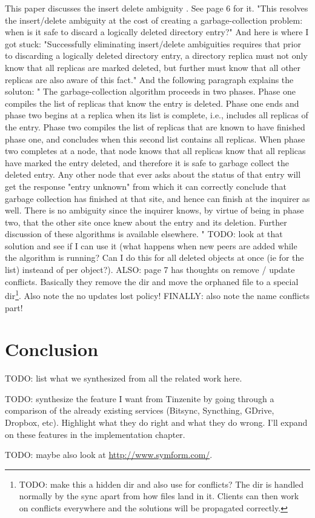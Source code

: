 This paper discusses the insert delete ambiguity \cite{page1998perspectives}.
See page 6 for it.
"This resolves the insert/delete ambiguity at the cost of creating a garbage-collection problem: when is it safe to discard a logically deleted directory entry?"
And here is where I got stuck: "Successfully eliminating insert/delete ambiguities requires that prior to discarding a logically deleted directory entry, a directory replica must not only know that all replicas are marked deleted, but further must know that all other replicas are also aware of this fact."
And the following paragraph explains the soluton: "
The garbage-collection algorithm proceeds in two phases.
Phase one compiles the list of replicas that know the entry is deleted.
Phase one ends and phase two begins at a replica when its list is complete, i.e., includes all replicas of the entry.
Phase two compiles the list of replicas that are known to have finished phase one, and concludes when this second list contains all replicas.
When phase two completes at a node, that node knows that all replicas know that all replicas have marked the entry deleted, and therefore it is safe to garbage collect the deleted entry.
Any other node that ever asks about the status of that entry will get the response "entry unknown" from which it can correctly conclude that garbage collection has finished at that site, and hence can finish at the inquirer as well.
There is no ambiguity since the inquirer knows, by virtue of being in phase two, that the other site once knew about the entry and its deletion.
Further discussion of these algorithms is available elsewhere.
"
TODO: look at that solution and see if I can use it (what happens when new peers are added while the algorithm is running? Can I do this for all deleted objects at once (ie for the list) insteand of per object?).
ALSO: page 7 has thoughts on remove / update conflicts.
Basically they remove the dir and move the orphaned file to a special dir\footnote{TODO: make this a hidden dir and also use for conflicts? The dir is handled normally by the sync apart from how files land in it. Clients can then work on conflicts everywhere and the solutions will be propagated correctly.}.
Also note the no updates lost policy!
FINALLY: also note the name conflicts part!

\section{Conclusion}

TODO: list what we synthesized from all the related work here.

TODO: synthesize the feature I want from Tinzenite by going through a comparison of the already existing services (Bitsync, Syncthing, GDrive, Dropbox, etc).
Highlight what they do right and what they do wrong.
I'll expand on these features in the implementation chapter.

TODO: maybe also look at \url{http://www.symform.com/}.
